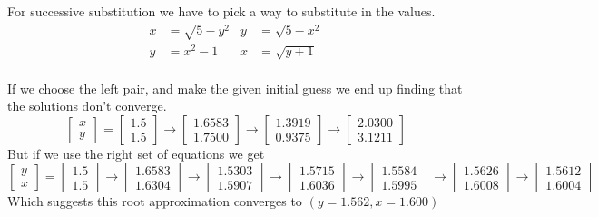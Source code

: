 \documentclass{article}
\begin{document}
\begin{solution}
For successive substitution we have to pick a way to substitute in the values.
\begin{align*}
x&=\sqrt{5-y^{2}}	&	y&=\sqrt{5-x^{2}}\\
y&=x^{2}-1			&	x&=\sqrt{y+1}
\end{align*}
\paragraph{}
If we choose the left pair, and make the given initial guess we end up finding that the solutions don't converge.
\[
\begin{bmatrix}
x\\
y
\end{bmatrix}
=
\begin{bmatrix}
1.5\\
1.5
\end{bmatrix}
\to
\begin{bmatrix}
1.6583\\
1.7500
\end{bmatrix}
\to
\begin{bmatrix}
1.3919\\
0.9375
\end{bmatrix}
\to
\begin{bmatrix}
2.0300\\
3.1211
\end{bmatrix}
\]
But if we use the right set of equations we get
\[
\begin{bmatrix}
y\\
x
\end{bmatrix}
=
\begin{bmatrix}
1.5\\
1.5
\end{bmatrix}
\to
\begin{bmatrix}
1.6583\\
1.6304
\end{bmatrix}
\to
\begin{bmatrix}
1.5303\\
1.5907
\end{bmatrix}
\to
\begin{bmatrix}
1.5715\\
1.6036
\end{bmatrix}
\to
\begin{bmatrix}
1.5584\\
1.5995
\end{bmatrix}
\to
\begin{bmatrix}
1.5626\\
1.6008
\end{bmatrix}
\to
\begin{bmatrix}
1.5612\\
1.6004
\end{bmatrix}
\]
Which suggests this root approximation converges to $(y=1.562,x=1.600)$
\end{solution}
\end{document}
